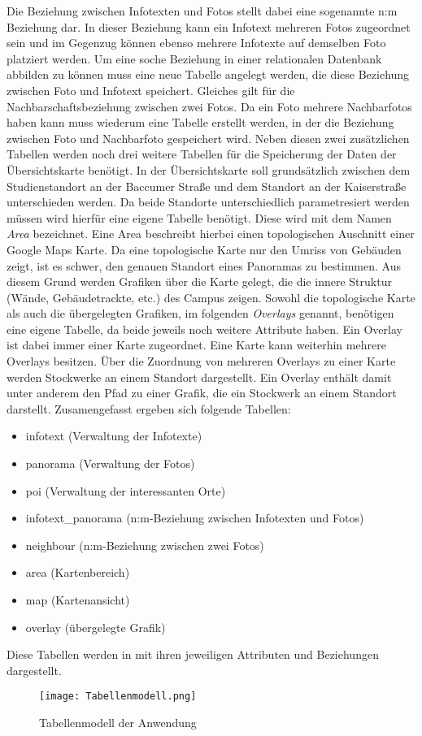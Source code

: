 Die Beziehung zwischen Infotexten und Fotos stellt dabei eine sogenannte
n:m Beziehung dar. In dieser Beziehung kann ein Infotext mehreren Fotos
zugeordnet sein und im Gegenzug können ebenso mehrere Infotexte auf demselben
Foto platziert werden. Um eine soche Beziehung in einer relationalen Datenbank
abbilden zu können muss eine neue Tabelle angelegt werden, die diese Beziehung
zwischen Foto und Infotext speichert. Gleiches gilt für die
Nachbarschaftsbeziehung zwischen zwei Fotos. Da ein Foto mehrere Nachbarfotos
haben kann muss wiederum eine Tabelle erstellt werden, in der die Beziehung
zwischen Foto und Nachbarfoto gespeichert wird. Neben diesen zwei zusätzlichen
Tabellen werden noch drei weitere Tabellen für die Speicherung der Daten der
Übersichtskarte benötigt. In der Übersichtskarte soll grundsätzlich zwischen dem
Studienstandort an der Baccumer Straße und dem Standort an der Kaiserstraße
unterschieden werden. Da beide Standorte unterschiedlich parametresiert werden 
müssen wird hierfür eine eigene Tabelle benötigt. Diese wird mit dem Namen
\textit{Area} bezeichnet. Eine Area beschreibt hierbei einen topologischen
Auschnitt einer Google Maps Karte. Da eine topologische Karte nur den Umriss von
Gebäuden zeigt, ist es schwer, den genauen Standort eines Panoramas zu
bestimmen. Aus diesem Grund werden Grafiken über die Karte gelegt, die die
innere Struktur (Wände, Gebäudetrackte, etc.) des Campus zeigen. Sowohl die
topologische Karte als auch die übergelegten Grafiken, im folgenden
\textit{Overlays} genannt, benötigen eine eigene Tabelle, da beide jeweils noch
weitere Attribute haben. Ein Overlay ist dabei immer einer Karte zugeordnet.
Eine Karte kann weiterhin mehrere Overlays besitzen. Über die Zuordnung von
mehreren Overlays zu einer Karte werden Stockwerke an einem Standort
dargestellt. Ein Overlay enthält damit unter anderem den Pfad zu einer Grafik,
die ein Stockwerk an einem Standort darstellt. Zusamengefasst ergeben sich
folgende Tabellen:

\begin{itemize}
  \item infotext (Verwaltung der Infotexte)
  \item panorama (Verwaltung der Fotos)
  \item poi (Verwaltung der interessanten Orte)
  \item infotext\_panorama (n:m-Beziehung zwischen Infotexten und Fotos)
  \item neighbour (n:m-Beziehung zwischen zwei Fotos)
  \item area (Kartenbereich)
  \item map (Kartenansicht)
  \item overlay (übergelegte Grafik)
\end{itemize}

Diese Tabellen werden in  mit ihren jeweiligen
Attributen und Beziehungen dargestellt.

\begin{figure}[htb]
\centering
\texttt{[image: Tabellenmodell.png]}
\caption[Tabellenmodell der Anwendung]{Tabellenmodell der Anwendung\protect\footnotemark}
\label{fig:Tabellenmodell}
\end{figure}
